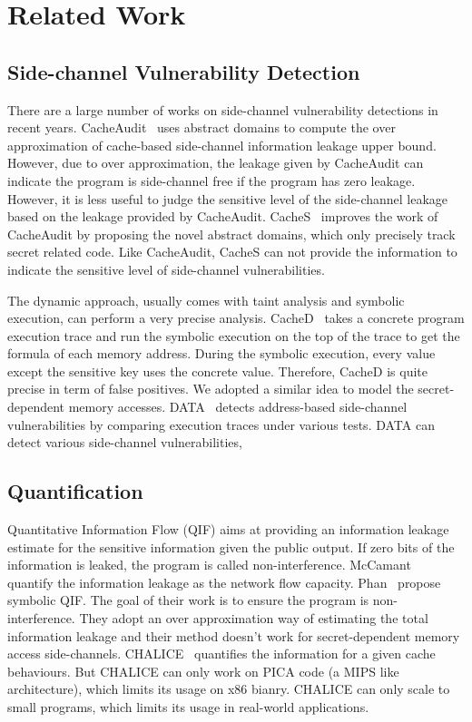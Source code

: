\section{Related Work}

\subsection{Side-channel Vulnerability Detection}

There are a large number of works on side-channel vulnerability detections in recent years.
CacheAudit~\cite{182946} uses abstract domains to compute the over approximation of cache-based
side-channel information leakage upper bound. However, due to over approximation, the leakage
given by CacheAudit can indicate the program is side-channel free if the program has zero leakage. 
However, it is less useful to judge the sensitive level of the side-channel leakage based on the
leakage provided by CacheAudit. CacheS~\cite{236338} improves the work of CacheAudit by proposing 
the novel abstract domains, which only precisely track secret related code. Like CacheAudit, CacheS
can not provide the information to indicate the sensitive level of side-channel vulnerabilities.

The dynamic approach, usually comes with taint analysis and symbolic execution, can perform a very 
precise analysis. CacheD~\cite{203878} takes a concrete program execution trace and run the symbolic
execution on the top of the trace to get the formula of each memory address. During the symbolic
execution, every value except the sensitive key uses the concrete value. Therefore, CacheD is quite 
precise in term of false positives. We adopted a similar idea to model the secret-dependent memory 
accesses. DATA~\cite{217537} detects address-based side-channel vulnerabilities by comparing 
execution traces under various tests. DATA can detect various side-channel vulnerabilities, 

\subsection{Quantification}
Quantitative Information Flow (QIF) aims at providing an information leakage estimate for the
sensitive information given the public output. If zero bits of the information is leaked, the 
program is called non-interference. McCamant~\cite{McCamantE2008} quantify the information leakage
as the network flow capacity. Phan~\cite{Phan:2012:SQI:2382756.2382791} propose symbolic QIF. The
goal of their work is to ensure the program is non-interference. They adopt an over
approximation way of estimating the total information leakage and their method doesn't work for
secret-dependent memory access side-channels. CHALICE~\cite{Chattopadhyay:2017:QIL:3127041.3127044}
quantifies the information for a given cache behaviours. But CHALICE can only 
work on PICA code (a MIPS like architecture), which limits its usage on x86 bianry. 
CHALICE can only scale to small programs, which limits its usage in
real-world applications.
